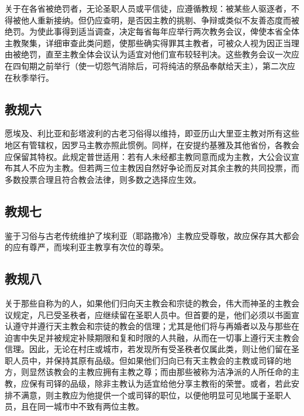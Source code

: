 关于在各省被绝罚者，无论圣职人员或平信徒，应遵循教规：被某些人驱逐者，不得被他人重新接纳。但仍应查明，是否因主教的挑剔、争辩或类似不友善态度而被绝罚。为使此事得到适当调查，决定每省每年应举行两次教务会议，俾使本省全体主教聚集，详细审查此类问题，使那些确实得罪其主教者，可被众人视为因正当理由被绝罚，直至主教全体会议认为适宜对他们宣布较轻判决。这些教务会议一次应在四旬期之前举行（使一切怨气消除后，可将纯洁的祭品奉献给天主），第二次应在秋季举行。\par


\subsection{教规六}

愿埃及、利比亚和彭塔波利的古老习俗得以维持，即亚历山大里亚主教对所有这些地区有管辖权，因罗马主教亦照此惯例。同样，在安提约基雅及其他省份，各教会应保留其特权。此规定普世适用：若有人未经都主教同意而成为主教，大公会议宣布其人不应为主教。但若两三位主教因自然好争论而反对其余主教的共同投票，而多数投票合理且符合教会法律，则多数之选择应生效。\par


\subsection{教规七}

鉴于习俗与古老传统维护了埃利亚（耶路撒冷）主教应受尊敬，故应保存其大都会的应有尊严，而埃利亚主教享有次位的尊荣。\par


\subsection{教规八}

关于那些自称为的人，如果他们归向天主教会和宗徒的教会，伟大而神圣的主教会议规定，凡已受圣秩者，应继续留在圣职人员中。但首要的是，他们必须以书面宣认遵守并遵行天主教会和宗徒的教会的信理；尤其是他们将与再婚者以及与那些在迫害中失足并被规定补赎期限和复和时限的人共融，从而在一切事上遵行天主教会信理。因此，无论在村庄或城市，若发现所有受圣秩者仅属此类，则让他们留在圣职人员中，并保持其原有品级。但如果他们归向已有天主教会的主教或司铎的地方，则显然该教会的主教应拥有主教之尊；而由那些被称为洁净派的人所任命的主教，应保有司铎的品级，除非主教认为适宜给他分享主教衔的荣誉。或者，若此安排不满意，则主教应为他提供一个或司铎的职位，以便他明显可见地属于圣职人员，且在同一城市中不致有两位主教。\par

